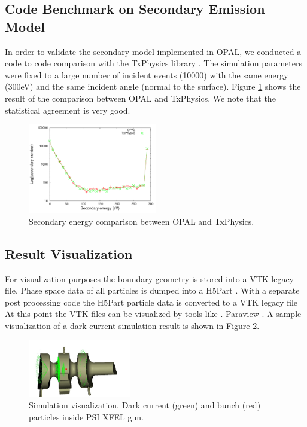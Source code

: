 \documentclass{JAC2003}
\begin{document}
\subsection{Code Benchmark on Secondary Emission Model}

In order to validate the secondary model implemented in OPAL, we conducted a
code to code comparison with the TxPhysics library \cite{TX}. The simulation
parameters were fixed to a large number of incident events (10000) with the same
energy (300eV) and the same incident angle (normal to the surface). Figure
\ref{fig:cc} shows the result of the comparison between OPAL and TxPhysics. We
note that the statistical agreement is very good.
%
\begin{figure}[H]
    \begin{center}
        \includegraphics[width=0.5\textwidth]{code_comparison.pdf}
    \end{center}
    \caption{Secondary energy comparison between OPAL and TxPhysics.\label{fig:cc}}
\end{figure}

\subsection{Result Visualization}

For visualization purposes the boundary geometry is stored into a VTK legacy
file. Phase space data of all particles is dumped into a H5Part \cite{??}. With
a separate post processing code the H5Part particle data is converted to a VTK
legacy file At this point the VTK files can be visualized by tools like        .
Paraview\cite{PR} . A sample visualization of a dark current simulation result
is shown in Figure \ref{fig:vi}.
%
\begin{figure}[H]
\begin{center}
\includegraphics[width=0.4\textwidth]{newgun.jpg}
\end{center}
\caption{Simulation visualization. Dark current (green) and bunch (red)
particles inside PSI XFEL gun.\label{fig:vi}}
\end{figure} 
\end{document}

